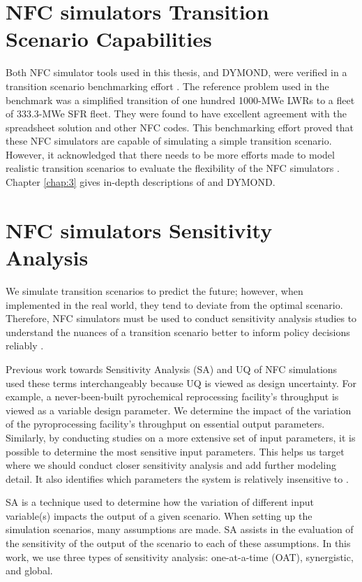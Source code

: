\section{\gls{NFC} simulators Transition Scenario Capabilities}
Both \gls{NFC} simulator tools used in this thesis, \Cyclus and DYMOND,
were verified in a transition scenario benchmarking effort
\cite{feng_standardized_2016,bae_standardized_2019}.
The reference problem used in the benchmark was a simplified 
transition of one hundred 1000-MWe \glspl{LWR} to a fleet 
of 333.3-MWe \gls{SFR} fleet. 
They were found to have excellent agreement with the 
spreadsheet solution and other \gls{NFC} codes.  
This benchmarking effort proved that these \gls{NFC} simulators
are capable of simulating a simple transition scenario. 
However, it acknowledged that there needs to be more efforts 
made to model realistic transition scenarios to evaluate the
flexibility of the \gls{NFC} simulators \cite{feng_standardized_2016}.
Chapter \ref{chap:3} gives in-depth descriptions of \Cyclus and DYMOND.

\section{\gls{NFC} simulators Sensitivity Analysis}
We simulate transition scenarios to predict the future; 
however, when implemented in the real world, they tend to deviate 
from the optimal scenario.
Therefore, \gls{NFC} simulators must be used to conduct
sensitivity analysis studies to understand the nuances of 
a transition scenario better to inform policy decisions reliably
\cite{passerini_systematic_2014}. 

Previous work towards Sensitivity Analysis (SA) and \gls{UQ} of 
\gls{NFC} simulations used these terms interchangeably
because \gls{UQ} is viewed as design uncertainty.
For example, a never-been-built pyrochemical reprocessing 
facility's throughput is viewed as a variable design parameter.
We determine the impact of the variation of the pyroprocessing 
facility's throughput on essential output parameters.
Similarly, by conducting studies on a more extensive set of input 
parameters, it is possible to determine the most sensitive input 
parameters.
This helps us target where we should conduct closer 
sensitivity analysis and add further modeling detail.
It also identifies which parameters the system is relatively 
insensitive to \cite{noauthor_effects_2017}. 

\gls{SA} is a technique used to determine how the variation of 
different input variable(s) impacts the output of a given 
scenario. 
When setting up the simulation scenarios, many assumptions are made. 
\gls{SA} assists in the evaluation of the sensitivity of the 
output of the scenario to each of these assumptions. 
In this work, we use three types of sensitivity analysis: 
one-at-a-time (OAT), synergistic, and global.

